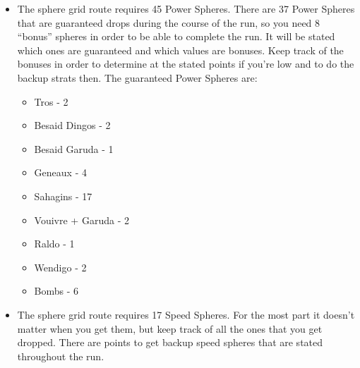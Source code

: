 \begin{itemize}
    \item The sphere grid route requires 45 Power Spheres. There are 37 Power Spheres that are guaranteed drops during the course of the run, so you need 8 ``bonus'' spheres in order to be able to complete the run. It will be stated which ones are guaranteed and which values are bonuses. Keep track of the bonuses in order to determine at the stated points if you're low and to do the backup strats then. The guaranteed Power Spheres are:
    \begin{itemize}
        \item Tros - 2
        \item Besaid Dingos - 2
        \item Besaid Garuda - 1
        \item Geneaux - 4
        \item Sahagins - 17
        \item Vouivre + Garuda - 2
        \item Raldo - 1
        \item Wendigo - 2
        \item Bombs - 6
    \end{itemize}
    \item The sphere grid route requires 17 Speed Spheres. For the most part it doesn't matter when you get them, but keep track of all the ones that you get dropped. There are points to get backup speed spheres that are stated throughout the run.
\end{itemize}

